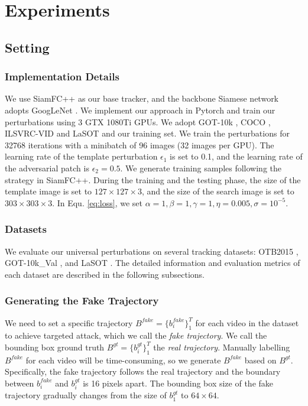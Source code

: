 \documentclass{article}
\begin{document}
\section{Experiments}

\subsection{Setting}

\subsubsection{Implementation Details}

We use SiamFC++ \cite{SiamFC++} as our base tracker, and the backbone Siamese network adopts GoogLeNet \cite{GoogLeNet}.
We implement our approach in Pytorch and train our perturbations using 3 GTX 1080Ti GPUs.
We adopt GOT-10k \cite{GOT-10k}, COCO \cite{COCO}, ILSVRC-VID \cite{VID} and LaSOT \cite{LaSOT} and our training set.
We train the perturbations for 32768 iterations with a minibatch of 96 images (32 images per GPU).
The learning rate of the template perturbation $\epsilon_1$ is set to 0.1, and the learning rate of the adversarial patch is $\epsilon_2 = 0.5$.
We generate training samples following the strategy in SiamFC++.
During the training and the testing phase, the size of the template image is set to $127\times 127\times 3$, and the size of the search image is set to $303\times 303\times 3$.
In Equ. \ref{eq:loss}, we set $\alpha=1, \beta=1, \gamma=1, \eta=0.005, \sigma=10^{-5}$.

\subsubsection{Datasets}
We evaluate our universal perturbations on several tracking datasets: OTB2015 \cite{OTB}, GOT-10k\_Val \cite{GOT-10k}, and LaSOT \cite{LaSOT}.
The detailed information and evaluation metrics of each dataset are described in the following subsections.

\subsubsection{Generating the Fake Trajectory}

We need to set a specific trajectory $B^{fake}=\{b^{fake}_i\}_1^{T}$ for each video in the dataset to achieve targeted attack, which we call the \textit{fake trajectory}. We call the bounding box ground truth $B^{gt}=\{b^{gt}_i\}_1^T$ the \textit{real trajectory}.
Manually labelling $B^{fake}$ for each video will be time-consuming, so we generate $B^{fake}$ based on $B^{gt}$.
Specifically, the fake trajectory follows the real trajectory and the boundary between $b^{fake}_i$ and $b^{gt}_i$ is 16 pixels apart.
The bounding box size of the fake trajectory gradually changes from the size of $b^{gt}_1$ to $64\times 64$.
\end{document}
